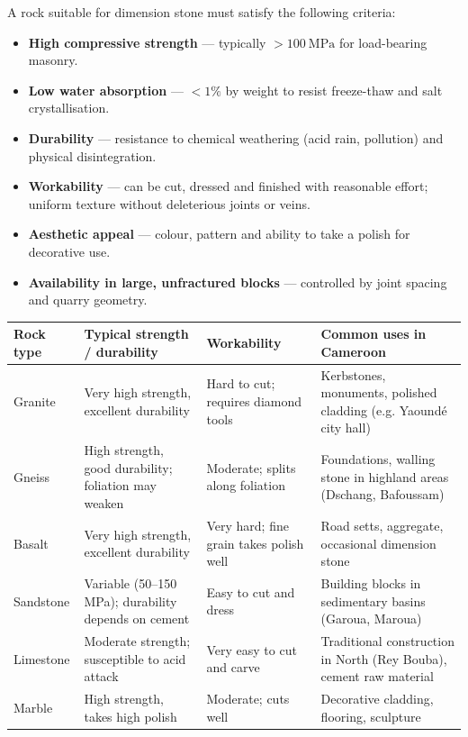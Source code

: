 \documentclass[11pt]{article}
\begin{document}
\begin{propriete}
A rock suitable for dimension stone must satisfy the following criteria:
\begin{itemize}
    \item \textbf{High compressive strength} — typically $> 100\ \mathrm{MPa}$ for load-bearing masonry.
    \item \textbf{Low water absorption} — $< 1\%$ by weight to resist freeze-thaw and salt crystallisation.
    \item \textbf{Durability} — resistance to chemical weathering (acid rain, pollution) and physical disintegration.
    \item \textbf{Workability} — can be cut, dressed and finished with reasonable effort; uniform texture without deleterious joints or veins.
    \item \textbf{Aesthetic appeal} — colour, pattern and ability to take a polish for decorative use.
    \item \textbf{Availability in large, unfractured blocks} — controlled by joint spacing and quarry geometry.
\end{itemize}
\end{propriete}

\begin{center}
\begin{tabularx}{\linewidth}{|l|X|X|X|}\hline
\rowcolor{popblueL}
\textbf{Rock type} & \textbf{Typical strength / durability} & \textbf{Workability} & \textbf{Common uses in Cameroon} \\ \hline
Granite & Very high strength, excellent durability & Hard to cut; requires diamond tools & Kerbstones, monuments, polished cladding (e.g. Yaoundé city hall) \\ \hline
Gneiss & High strength, good durability; foliation may weaken & Moderate; splits along foliation & Foundations, walling stone in highland areas (Dschang, Bafoussam) \\ \hline
Basalt & Very high strength, excellent durability & Very hard; fine grain takes polish well & Road setts, aggregate, occasional dimension stone \\ \hline
Sandstone & Variable (50--150 MPa); durability depends on cement & Easy to cut and dress & Building blocks in sedimentary basins (Garoua, Maroua) \\ \hline
Limestone & Moderate strength; susceptible to acid attack & Very easy to cut and carve & Traditional construction in North (Rey Bouba), cement raw material \\ \hline
Marble & High strength, takes high polish & Moderate; cuts well & Decorative cladding, flooring, sculpture \\ \hline
\end{tabularx}
\end{center}
\end{document}

